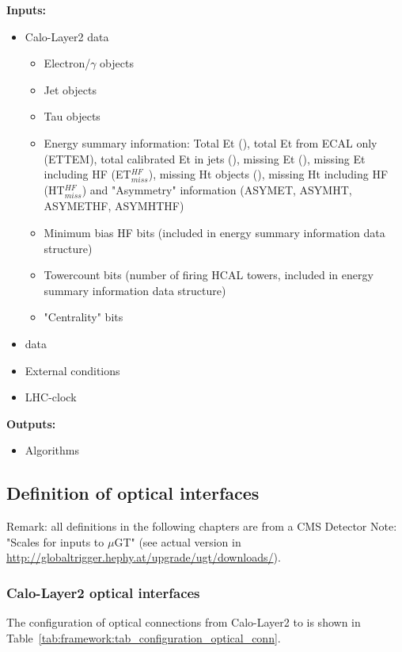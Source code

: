 \textbf{Inputs:}
\begin{itemize}
\item Calo-Layer2 data
\begin{itemize}
\item Electron/$\gamma$ objects
\item Jet objects
\item Tau objects
\item Energy summary information: Total Et (\ett), total Et from ECAL only (ETTEM), total calibrated Et in jets (\htt), missing Et (\etm), missing Et including HF (ET$_{miss}^{HF}$), missing Ht objects (\htm),
missing Ht including HF (HT$_{miss}^{HF}$) and "Asymmetry" information (ASYMET, ASYMHT, ASYMETHF, ASYMHTHF) 
\item Minimum bias HF bits (included in energy summary information data structure)
\item Towercount bits (number of firing HCAL towers, included in energy summary information data structure)
\item "Centrality" bits
\end{itemize}
\item \gmt data
\item External conditions
\item LHC-clock 
\end{itemize}
\textbf{Outputs:}
\begin{itemize}
\item Algorithms
\end{itemize}

\subsection{Definition of optical interfaces}
\label{sec:gtl:optical_interfaces}

Remark: all definitions in the following chapters are from a CMS Detector Note: "Scales for inputs to $\mu$GT" (see actual version in \url{http://globaltrigger.hephy.at/upgrade/ugt/downloads/}).

\subsubsection{Calo-Layer2 optical interfaces}
\label{sec:gtl:gct_optical_interfaces}

The configuration of optical connections from Calo-Layer2 to \ugt is shown in Table~\ref{tab:framework:tab_configuration_optical_conn}.\\

